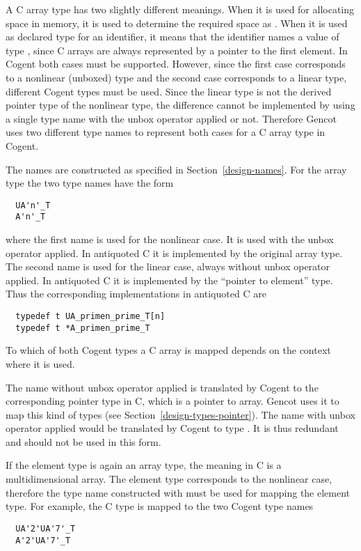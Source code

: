 A C array type  has two slightly different meanings. When it is used for allocating space in memory,
it is used to determine the required space as . When it is used as declared type for an 
identifier, it means that the identifier names a value of type , since C arrays are always represented
by a pointer to the first element. In Cogent both cases must be supported. However, since the first case 
corresponds to a nonlinear (unboxed) type and the second case corresponds to a linear type, different Cogent
types must be used. Since the linear type is not the derived pointer type of the nonlinear type, the 
difference cannot be implemented by using a single type name with the unbox operator applied or not. Therefore
Gencot uses two different type names to represent both cases for a C array type in Cogent.

The names are constructed as specified in Section~\ref{design-names}. For the array type  the two
type names have the form
\begin{verbatim}
  UA'n'_T
  A'n'_T
\end{verbatim}
where the first name is used for the nonlinear case. It is used with the unbox operator applied.
In antiquoted C it is implemented by the original array type. The second name is used for the linear
case, always without unbox operator applied. In antiquoted C it is implemented by the ``pointer to
element'' type. Thus the corresponding implementations in antiquoted C are
\begin{verbatim}
  typedef t UA_primen_prime_T[n]
  typedef t *A_primen_prime_T
\end{verbatim}

To which of both Cogent types a C array is mapped depends on the context where it is used.

The name  without unbox operator applied is translated by Cogent to the corresponding 
pointer type in C, which is a pointer to array. Gencot uses it to map this kind of types (see 
Section~\ref{design-types-pointer}).
The name  with unbox operator applied would be translated by Cogent to type .
It is thus redundant and should not be used in this form.

If the element type  is again an array type, the meaning in C is a multidimensional array. The
element type corresponds to the nonlinear case, therefore the type name constructed with 
must be used for mapping the element type. For example, the C type  is mapped to the
two Cogent type names
\begin{verbatim}
  UA'2'UA'7'_T
  A'2'UA'7'_T
\end{verbatim}

